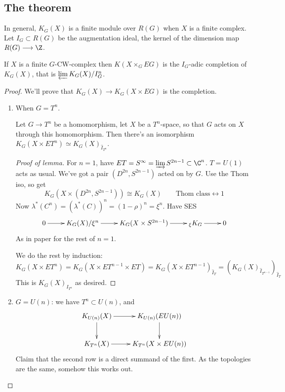 \documentclass[11pt]{article}
\begin{document}
\begin{GuozhenEqKthyPractice}
\subsection*{The theorem}
In general, $K_G(X)$ is a finite module over $R(G)$ when $X$ is a finite complex.  Let $I_G\subset R(G)$ be the augmentation ideal, the kernel of the dimension map $R(G)\to\Z$.
\begin{thm*}
If $X$ is a finite $G$-CW-complex  then $K(X\times_G EG)$ is the $I_G$-adic completion of $K_G(X)$, that is $\varprojlim K_G(X)/I_G^n$.
\end{thm*}
\begin{proof}
We'll prove that $K_G(X)\to K_G(X\times EG)$ is the completion.
\begin{enumerate}
\item When $G=T^n$.
\begin{lem*}
Let $G\to T^n$ be a homomorphism, let $X$ be a $T^n$-space, so that $G$ acts on $X$ through this homomorphism. Then there's an isomorphism $K_G(X\times ET^n)\simeq K_G(X)_{\hat I_{T^n}}$.
\end{lem*}
\begin{proof}[Proof of lemma]
For $n=1$, have $ET=S^\infty=\varinjlim S^{2n-1}\subset \C^n$. $T=U(1)$ acts as usual. We've got a pair $(D^{2n},S^{2n-1})$ acted on by $G$. Use the Thom iso, so get
\[K_G(X\times(D^{2n},S^{2n-1}))\cong K_G(X)\qquad    \text{Thom class}\longleftrightarrow 1\]
Now $\lambda^*(C^n)=(\lambda^*(C))^n= (1-\rho)^n=\xi^n$. Have SES
\[\xymatrix{
0\ar[r] &K_G(X)/\xi^n\ar[r] &K_G(X\times S^{2n-1})\ar[r]& {_{\xi}K_G}\ar[r]&0
}\]
As in paper for the rest of $n=1$.

We do the rest by induction:
\[K_G(X\times ET^n)=K_G(X\times ET^{n-1}\times ET)=K_G(X\times ET^{n-1})_{\hat I_T}=(K_G(X)_{\hat I_{T^{n-1}}})_{\hat I_{T}}\]
This is $K_G(X)_{I_{T^n}}$ as desired.
\end{proof}
\item $G=U(n)$: we have $T^n\subset U(n)$, and 
\[\xymatrix{
K_{U(n)}(X)\ar[r]\ar[d]& K_{U(n)}(EU(n))\ar[d]\\
\ar[r]K_{T^n}(X)&K_{T^n}(X\times EU(n))
}\]
Claim that the second row is a direct summand of the first. As the topologies are the same, somehow this works out.


\end{enumerate}
\end{proof}
\end{GuozhenEqKthyPractice}
\end{document}
